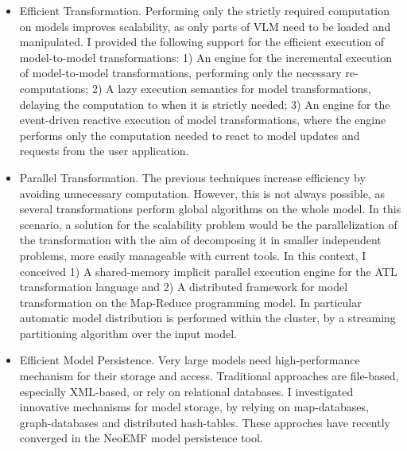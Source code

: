 \begin{itemize}

\item Efficient Transformation. Performing only the strictly required computation on models improves scalability, as only parts of VLM need to be loaded and manipulated. I provided the following support for the efficient execution of model-to-model transformations:
1) An engine for the incremental execution of model-to-model transformations, performing only the necessary re-computations; 2) A lazy execution semantics for model transformations, delaying the computation to when it is strictly needed; 3) An engine for the event-driven reactive execution of model transformations, where the engine performs only the computation needed to react to model updates and requests from the user application.

\item Parallel Transformation. The previous techniques increase efficiency by avoiding unnecessary computation. However, this is not always possible, as several transformations perform global algorithms on the whole model. In this scenario, a solution for the scalability problem would be the parallelization of the transformation with the aim of  decomposing it in smaller independent problems, more easily manageable with current tools. In this context, I conceived 1) A shared-memory implicit parallel execution engine for the ATL transformation language and 2) A distributed framework for model transformation on the Map-Reduce programming model. In particular automatic model distribution is performed within the cluster, by a streaming partitioning algorithm over the input model.

\item Efficient Model Persistence. Very large models need high-performance mechanism for their storage and access. Traditional approaches are file-based, especially XML-based, or rely on relational databases. I investigated innovative mechanisms for model storage, by relying on map-databases, graph-databases and distributed hash-tables. These approches have recently converged in the NeoEMF model persistence tool.

\end{itemize}
